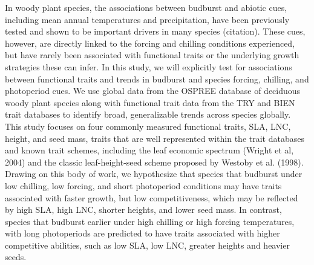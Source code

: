 \documentclass{article}\usepackage[]{graphicx}\usepackage[]{color}
\begin{document}
In woody plant species, the associations between budburst and abiotic cues, including mean annual temperatures and precipitation, have been previously tested and shown to be important drivers in many species (citation). These cues, however, are directly linked to the forcing and chilling conditions experienced, but have rarely been associated with functional traits or the underlying growth strategies these can infer.  In this study, we will explicitly test for associations between functional traits and trends in budburst and species forcing, chilling, and photoperiod cues. We use global data from the OSPREE database of deciduous woody plant species along with functional trait data from the TRY and BIEN trait databases to identify broad, generalizable trends across species globally. This study focuses on four commonly measured functional traits, SLA, LNC, height, and seed mass, traits that are well represented within the trait databases and known trait schemes, including the leaf economic spectrum (Wright et al, 2004) and the classic leaf-height-seed scheme proposed by Westoby et al. (1998). Drawing on this body of work, we hypothesize that species that budburst under low chilling, low forcing, and short photoperiod conditions may have traits associated with faster growth, but low competitiveness, which may be reflected by high SLA, high LNC, shorter heights, and lower seed mass. In contrast, species that budburst earlier under high chilling or high forcing temperatures, with long photoperiods are predicted to have traits associated with higher competitive abilities, such as low SLA, low LNC, greater heights and heavier seeds. 
\end{document}
